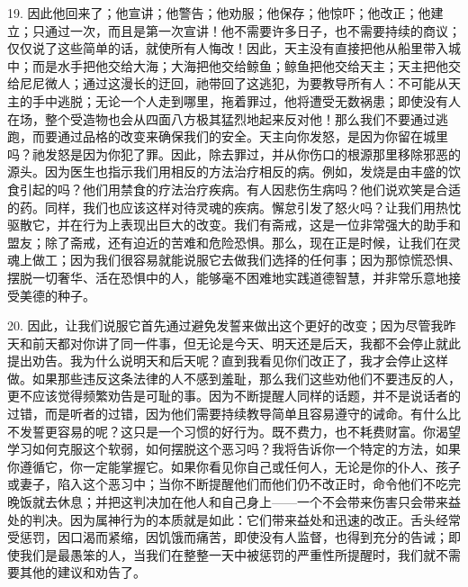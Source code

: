 19. 因此他回来了；他宣讲；他警告；他劝服；他保存；他惊吓；他改正；他建立；只通过一次，而且是第一次宣讲！他不需要许多日子，也不需要持续的商议；仅仅说了这些简单的话，就使所有人悔改！因此，天主没有直接把他从船里带入城中；而是水手把他交给大海；大海把他交给鲸鱼；鲸鱼把他交给天主；天主把他交给尼尼微人；通过这漫长的迂回，祂带回了这逃犯，为要教导所有人：不可能从天主的手中逃脱；无论一个人走到哪里，拖着罪过，他将遭受无数祸患；即使没有人在场，整个受造物也会从四面八方极其猛烈地起来反对他！那么我们不要通过逃跑，而要通过品格的改变来确保我们的安全。天主向你发怒，是因为你留在城里吗？祂发怒是因为你犯了罪。因此，除去罪过，并从你伤口的根源那里移除邪恶的源头。因为医生也指示我们用相反的方法治疗相反的病。例如，发烧是由丰盛的饮食引起的吗？他们用禁食的疗法治疗疾病。有人因悲伤生病吗？他们说欢笑是合适的药。同样，我们也应该这样对待灵魂的疾病。懈怠引发了怒火吗？让我们用热忱驱散它，并在行为上表现出巨大的改变。我们有斋戒，这是一位非常强大的助手和盟友；除了斋戒，还有迫近的苦难和危险恐惧。那么，现在正是时候，让我们在灵魂上做工；因为我们很容易就能说服它去做我们选择的任何事；因为那惊慌恐惧、摆脱一切奢华、活在恐惧中的人，能够毫不困难地实践道德智慧，并非常乐意地接受美德的种子。\par

20. 因此，让我们说服它首先通过避免发誓来做出这个更好的改变；因为尽管我昨天和前天都对你讲了同一件事，但无论是今天、明天还是后天，我都不会停止就此提出劝告。我为什么说明天和后天呢？直到我看见你们改正了，我才会停止这样做。如果那些违反这条法律的人不感到羞耻，那么我们这些劝他们不要违反的人，更不应该觉得频繁劝告是可耻的事。因为不断提醒人同样的话题，并不是说话者的过错，而是听者的过错，因为他们需要持续教导简单且容易遵守的诫命。有什么比不发誓更容易的呢？这只是一个习惯的好行为。既不费力，也不耗费财富。你渴望学习如何克服这个软弱，如何摆脱这个恶习吗？我将告诉你一个特定的方法，如果你遵循它，你一定能掌握它。如果你看见你自己或任何人，无论是你的仆人、孩子或妻子，陷入这个恶习中；当你不断提醒他们而他们仍不改正时，命令他们不吃完晚饭就去休息；并把这判决加在他人和自己身上——一个不会带来伤害只会带来益处的判决。因为属神行为的本质就是如此：它们带来益处和迅速的改正。舌头经常受惩罚，因口渴而紧缩，因饥饿而痛苦，即使没有人监督，也得到充分的告诫；即使我们是最愚笨的人，当我们在整整一天中被惩罚的严重性所提醒时，我们就不需要其他的建议和劝告了。\par

